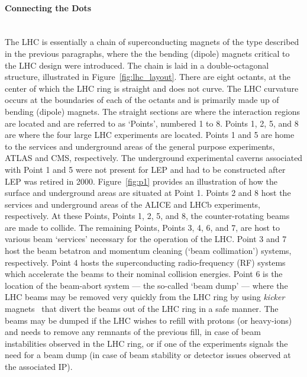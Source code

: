 \paragraph{Connecting the Dots} \mbox{} \\
The LHC is essentially a chain of superconducting magnets of the type described in the previous paragraphs, where
the the bending (dipole) magnets critical to the LHC design were introduced.
The chain is laid in a double-octagonal structure, illustrated in Figure~\ref{fig:lhc_layout}. There are eight
octants, at the center of which the LHC ring is straight and does not curve.
The LHC curvature occurs at the
boundaries of each of the octants and is primarily made up of bending (dipole) magnets.
The straight sections are where the interaction regions are located and are referred
to as `Points', numbered 1 to 8.
Points 1, 2, 5, and 8 are where the four large LHC experiments are located.
Points 1 and 5 are home to the services and underground areas
of the general purpose experiments, ATLAS and CMS, respectively.
The underground experimental caverns associated with Point 1 and 5 were not present for LEP and
had to be constructed after LEP was retired in 2000.
Figure~\ref{fig:p1} provides an illustration of how the surface and underground
areas are situated at Point 1.
Points 2 and 8 host the services and underground areas of the ALICE and LHCb experiments, respectively.
At these Points, Points 1, 2, 5, and 8, the counter-rotating beams are
made to collide. The remaining Points, Points 3, 4, 6, and 7, are host to various beam `services'
necessary for the operation of the LHC.
Point 3 and 7 host the beam betatron and momentum cleaning (`beam collimation') systems, respectively.
Point 4 hosts the superconducting radio-frequency (RF) systems which accelerate the beams to
their nominal collision energies.
Point 6 is the location of the beam-abort system --- the so-called `beam dump' --- where
the LHC beams may be removed very quickly from the LHC ring by using \textit{kicker} magnets~\cite{LHCDesignI}
that divert the beams out of the LHC ring in a safe manner. The beams may be dumped
if the LHC wishes to refill with protons (or heavy-ions) and needs to remove any
remnants of the previous fill, in case of beam instabilities observed in the LHC ring,
or if one of the experiments signals the need for a beam dump (in case of
beam stability or detector issues observed at the associated IP).

